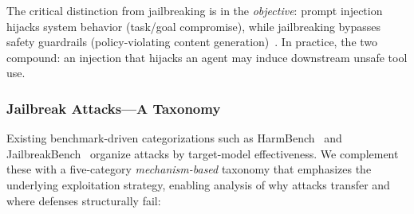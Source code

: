 The critical distinction from jailbreaking is in the \emph{objective}: prompt injection hijacks system behavior (task/goal compromise), while jailbreaking bypasses safety guardrails (policy-violating content generation)~\cite{perez2022ignore,chao2024jailbreakbench}. In practice, the two compound: an injection that hijacks an agent may induce downstream unsafe tool use.


\subsubsection{Jailbreak Attacks---A Taxonomy}
\label{sec:threat-jailbreak}

Existing benchmark-driven categorizations such as HarmBench~\cite{mazeika2024harmbench} and JailbreakBench~\cite{chao2024jailbreakbench} organize attacks by target-model effectiveness. We complement these with a five-category \emph{mechanism-based} taxonomy that emphasizes the underlying exploitation strategy, enabling analysis of why attacks transfer and where defenses structurally fail:


